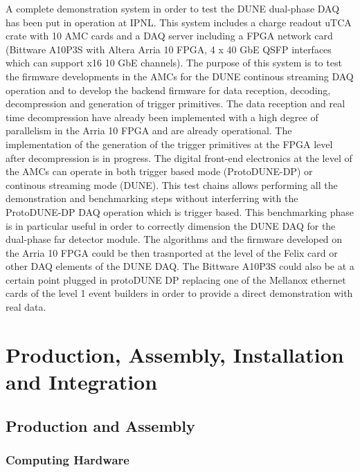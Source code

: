 A complete demonstration system in order to test the DUNE dual-phase DAQ has been put in operation at IPNL. This system
includes a charge readout uTCA crate with 10 AMC cards and a DAQ server including a FPGA network card (Bittware A10P3S with Altera Arria 10 FPGA,
4 x 40 GbE QSFP interfaces which can support  x16 10 GbE channels). The purpose of this system is to test the firmware developments in the AMCs for the DUNE continous streaming DAQ operation and  to develop the backend firmware for data reception, decoding, decompression and generation of trigger primitives. The data reception and real time decompression have already been implemented with a high degree of parallelism in the Arria 10 FPGA and are already operational. The implementation of the generation of the trigger primitives at the FPGA level after decompression is in progress. The digital front-end electronics at the level of the AMCs can operate in both trigger based mode (ProtoDUNE-DP) or continous streaming mode (DUNE). This test chains allows performing all the demonstration and benchmarking steps without interferring with the ProtoDUNE-DP DAQ operation which is trigger based. This benchmarking phase is in particular useful in order to correctly dimension the DUNE DAQ for the dual-phase far detector module. The algorithms and the firmware developed on the Arria 10 FPGA could be then trasnported at the level of the Felix card or other DAQ elements of the DUNE DAQ. The Bittware A10P3S could also be at a certain point plugged in protoDUNE DP replacing one of the Mellanox ethernet cards of the level 1 event builders in order to provide a direct demonstration with real data.


\section{Production, Assembly, Installation and Integration}
\label{sec:daq:production}


\subsection{Production and Assembly}

\subsubsection{Computing Hardware}

